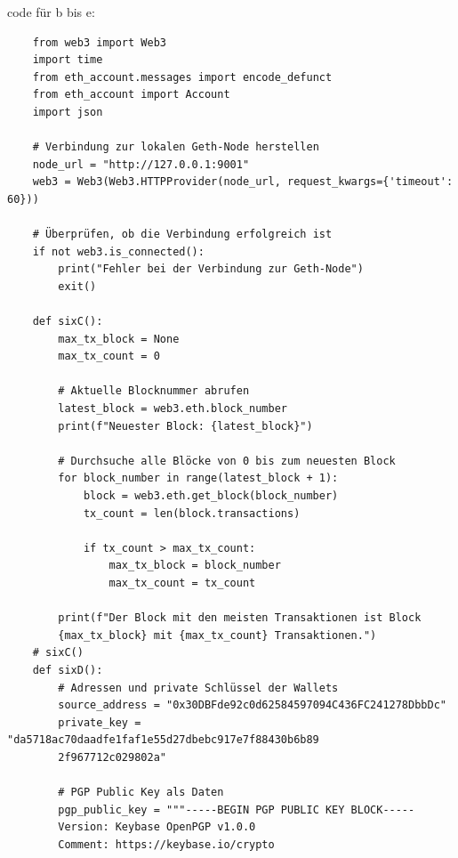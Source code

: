 \documentclass[german]{../uebung}
\begin{document}
\begin{exercise}{1}
    code für b bis e:
    \begin{verbatim}
    from web3 import Web3
    import time
    from eth_account.messages import encode_defunct
    from eth_account import Account
    import json

    # Verbindung zur lokalen Geth-Node herstellen
    node_url = "http://127.0.0.1:9001"
    web3 = Web3(Web3.HTTPProvider(node_url, request_kwargs={'timeout': 60}))

    # Überprüfen, ob die Verbindung erfolgreich ist
    if not web3.is_connected():
        print("Fehler bei der Verbindung zur Geth-Node")
        exit()

    def sixC():
        max_tx_block = None
        max_tx_count = 0

        # Aktuelle Blocknummer abrufen
        latest_block = web3.eth.block_number
        print(f"Neuester Block: {latest_block}")

        # Durchsuche alle Blöcke von 0 bis zum neuesten Block
        for block_number in range(latest_block + 1):
            block = web3.eth.get_block(block_number)
            tx_count = len(block.transactions)

            if tx_count > max_tx_count:
                max_tx_block = block_number
                max_tx_count = tx_count

        print(f"Der Block mit den meisten Transaktionen ist Block 
        {max_tx_block} mit {max_tx_count} Transaktionen.")
    # sixC()
    def sixD():
        # Adressen und private Schlüssel der Wallets
        source_address = "0x30DBFde92c0d62584597094C436FC241278DbbDc"
        private_key = "da5718ac70daadfe1faf1e55d27dbebc917e7f88430b6b89
        2f967712c029802a"

        # PGP Public Key als Daten
        pgp_public_key = """-----BEGIN PGP PUBLIC KEY BLOCK-----
        Version: Keybase OpenPGP v1.0.0
        Comment: https://keybase.io/crypto


\end{verbatim}
\end{exercise}
\end{document}
